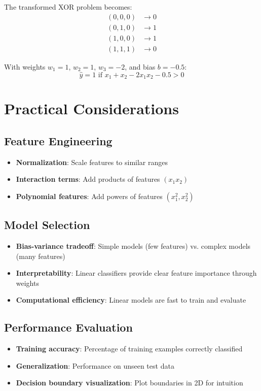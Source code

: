 The transformed XOR problem becomes:
\begin{align}
(0,0,0) &\rightarrow 0 \\
(0,1,0) &\rightarrow 1 \\
(1,0,0) &\rightarrow 1 \\
(1,1,1) &\rightarrow 0
\end{align}

With weights $w_1 = 1$, $w_2 = 1$, $w_3 = -2$, and bias $b = -0.5$:
\begin{equation}
\hat{y} = 1 \text{ if } x_1 + x_2 - 2x_1x_2 - 0.5 > 0
\end{equation}

\section{Practical Considerations}

\subsection{Feature Engineering}
\begin{itemize}
    \item \textbf{Normalization}: Scale features to similar ranges
    \item \textbf{Interaction terms}: Add products of features $(x_1 x_2)$
    \item \textbf{Polynomial features}: Add powers of features $(x_1^2, x_2^2)$
\end{itemize}

\subsection{Model Selection}
\begin{itemize}
    \item \textbf{Bias-variance tradeoff}: Simple models (few features) vs. complex models (many features)
    \item \textbf{Interpretability}: Linear classifiers provide clear feature importance through weights
    \item \textbf{Computational efficiency}: Linear models are fast to train and evaluate
\end{itemize}

\subsection{Performance Evaluation}
\begin{itemize}
    \item \textbf{Training accuracy}: Percentage of training examples correctly classified
    \item \textbf{Generalization}: Performance on unseen test data
    \item \textbf{Decision boundary visualization}: Plot boundaries in 2D for intuition
\end{itemize}

